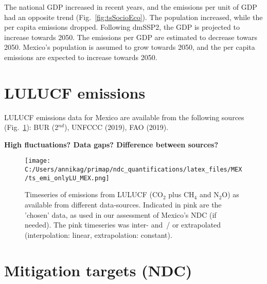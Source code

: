 \documentclass[12pt]{article}
\begin{document}
 The national GDP increased in recent years, and the emissions per unit of GDP had an opposite trend (Fig.~\ref{fig:tsSocioEco}).
 The population increased, while the per capita emissions dropped. 
 Following dmSSP2, the GDP is projected to increase towards 2050. 
 The emissions per GDP are estimated to decrease towars 2050. 
 Mexico's population is assumed to grow towards 2050, and the per capita emissions are expected to increase towards 2050. 

 \section{LULUCF emissions}
 \label{sec:emiLULUCF}
 LULUCF emissions data for Mexico are available from the following sources (Fig.~\ref{fig:tsLULUCF}): BUR (2$^{nd}$), UNFCCC (2019), FAO (2019).

 \textbf{High fluctuations? Data gaps? Difference between sources?}
 \begin{figure}[htbp]
 \centering
 \texttt{[image: C:/Users/annikag/primap/ndc\_quantifications/latex\_files/MEX/ts\_emi\_onlyLU\_MEX.png]}
 \caption{Timeseries of emissions from LULUCF (CO$_2$ plus CH$_4$ and N$_2$O) as available from different data-sources. 
 Indicated in pink are the 'chosen' data, as used in our assessment of Mexico's NDC (if needed). 
 The pink timeseries was inter- and~/ or extrapolated (interpolation: linear, extrapolation: constant).}
 \label{fig:tsLULUCF}
 \end{figure}

 \section{Mitigation targets (NDC)}
 \label{sec:mitiTars}
\end{document}
